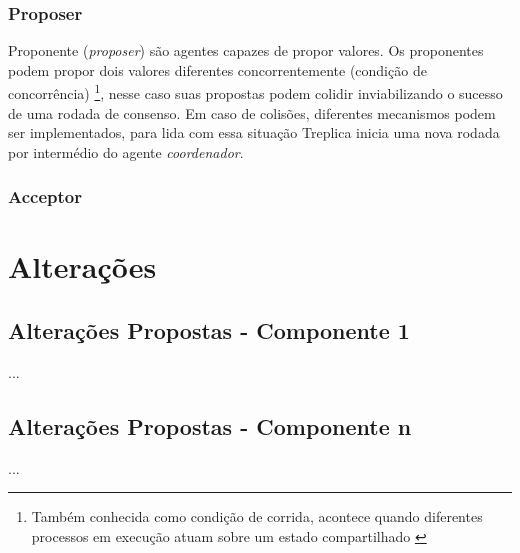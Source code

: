 \subsubsection{Proposer}

Proponente (\emph{proposer}) são agentes capazes de propor valores. Os proponentes podem
propor dois valores diferentes concorrentemente (condição de concorrência)
\footnote{Também conhecida como condição de corrida, acontece quando diferentes processos
em execução atuam sobre um estado compartilhado \cite{alguem}}, nesse caso suas propostas
podem colidir inviabilizando o sucesso de uma rodada de consenso. Em caso de colisões,
diferentes mecanismos podem ser implementados, para lida com essa situação Treplica inicia
uma nova rodada por intermédio do agente \emph{coordenador}.

\subsubsection{Acceptor}


\section{Alterações}

\subsection{Alterações Propostas - Componente 1}

...


\subsection{Alterações Propostas - Componente n}

...
